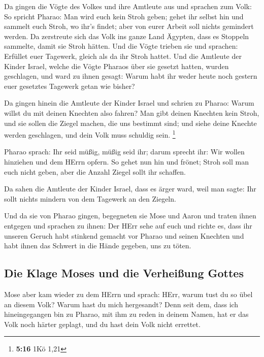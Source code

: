  Da gingen die Vögte des Volkes und ihre Amtleute aus und
sprachen zum Volk: So spricht Pharao: Man wird euch kein Stroh geben;
 gehet ihr selbst hin und sammelt euch Stroh, wo ihr's
findet; aber von eurer Arbeit soll nichts gemindert werden.
 Da zerstreute sich das Volk ins ganze Land Ägypten, dass
es Stoppeln sammelte, damit sie Stroh hätten.  Und die
Vögte trieben sie und sprachen: Erfüllet euer Tagewerk, gleich als da
ihr Stroh hattet.  Und die Amtleute der Kinder Israel,
welche die Vögte Pharaos über sie gesetzt hatten, wurden geschlagen, und
ward zu ihnen gesagt: Warum habt ihr weder heute noch gestern euer
gesetztes Tagewerk getan wie bisher?

 Da gingen hinein die Amtleute der Kinder Israel und
schrien zu Pharao: Warum willst du mit deinen Knechten also fahren?
 Man gibt deinen Knechten kein Stroh, und sie sollen die
Ziegel machen, die uns bestimmt sind; und siehe deine Knechte werden
geschlagen, und dein Volk muss schuldig sein. \footnote{\textbf{5:16}
  1Kö 1,21}

 Pharao sprach: Ihr seid müßig, müßig seid ihr; darum
sprecht ihr: Wir wollen hinziehen und dem HErrn opfern. 
So gehet nun hin und frönet; Stroh soll man euch nicht geben, aber die
Anzahl Ziegel sollt ihr schaffen.

 Da sahen die Amtleute der Kinder Israel, dass es ärger
ward, weil man sagte: Ihr sollt nichts mindern von dem Tagewerk an den
Ziegeln.

 Und da sie von Pharao gingen, begegneten sie Mose und
Aaron und traten ihnen entgegen  und sprachen zu ihnen:
Der HErr sehe auf euch und richte es, dass ihr unseren Geruch habt
stinkend gemacht vor Pharao und seinen Knechten und habt ihnen das
Schwert in die Hände gegeben, uns zu töten.

\hypertarget{die-klage-moses-und-die-verheiuxdfung-gottes}{%
\subsection{Die Klage Moses und die Verheißung
Gottes}\label{die-klage-moses-und-die-verheiuxdfung-gottes}}

 Mose aber kam wieder zu dem HErrn und sprach: HErr,
warum tust du so übel an diesem Volk? Warum hast du mich hergesandt?
 Denn seit dem, dass ich hineingegangen bin zu Pharao,
mit ihm zu reden in deinem Namen, hat er das Volk noch härter geplagt,
und du hast dein Volk nicht errettet.

